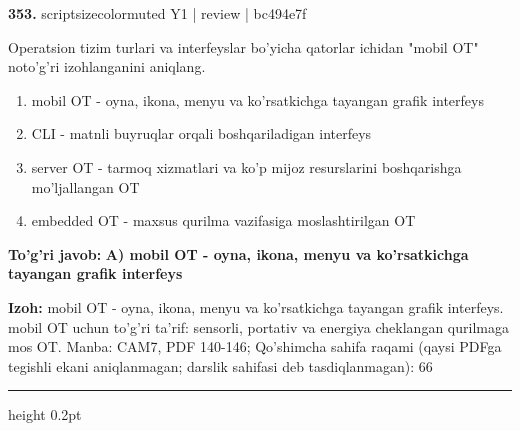 \documentclass[10pt,a4paper]{article}
\begin{document}
{\bfseries\sffamily\color{ink} 353.} {scriptsizecolor{muted} Y1 | review | bc494e7f}
\par
Operatsion tizim turlari va interfeyslar bo'yicha qatorlar ichidan "mobil OT" noto'g'ri izohlanganini aniqlang.
\begin{enumerate}[label=\Alph*),leftmargin=9mm]
\item mobil OT - oyna, ikona, menyu va ko'rsatkichga tayangan grafik interfeys
\item CLI - matnli buyruqlar orqali boshqariladigan interfeys
\item server OT - tarmoq xizmatlari va ko'p mijoz resurslarini boshqarishga mo'ljallangan OT
\item embedded OT - maxsus qurilma vazifasiga moslashtirilgan OT
\end{enumerate}
\begin{tcolorbox}[enhanced,breakable,colback=teal!4,colframe=teal!60!black,boxrule=0.45pt,arc=1.2mm,left=2.7mm,right=2.7mm,top=1.8mm,bottom=1.8mm,before skip=2mm,after skip=2mm]
{\bfseries\sffamily\color{teal}To'g'ri javob:} \textbf{A) mobil OT - oyna, ikona, menyu va ko'rsatkichga tayangan grafik interfeys}
\par\smallskip
{\bfseries Izoh:} mobil OT - oyna, ikona, menyu va ko'rsatkichga tayangan grafik interfeys. mobil OT uchun to'g'ri ta'rif: sensorli, portativ va energiya cheklangan qurilmaga mos OT. Manba: CAM7, PDF 140-146; Qo'shimcha sahifa raqami (qaysi PDFga tegishli ekani aniqlanmagan; darslik sahifasi deb tasdiqlanmagan): 66
\end{tcolorbox}
\vspace{2mm}\hrule height 0.2pt\vspace{3mm}
\end{document}
